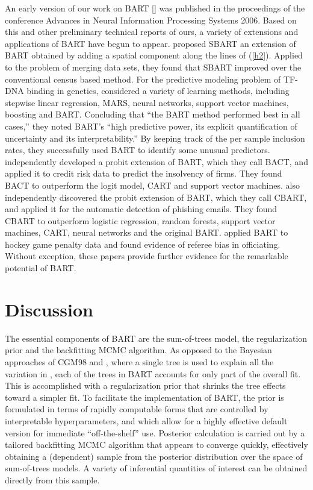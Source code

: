 \documentclass[aoas,nameyear,dvips]{arximspdf}
\newcommand{\citeasnoun}[1]{\citet{#1}}
\begin{document}
An early version of our work on BART [\citet{ChipGeorMcCu2007}] was
published in the proceedings of the conference Advances in Neural
Information Processing Systems 2006.  Based on this and other
preliminary technical reports of ours, a variety of extensions and
applications of BART have begun to appear.  \citeasnoun{ZhaShiMul2007}
proposed SBART an extension of BART obtained by adding a spatial
component along the lines of (\ref{h2}).  Applied to the problem of
merging data sets, they found that SBART improved over the conventional
census based method.  For the predictive modeling problem of TF-DNA
binding in genetics, \citeasnoun{ZhoLiu2008} considered a variety of learning methods,
including stepwise linear regression, MARS, neural networks, support
vector machines, boosting and BART.  Concluding that ``the BART method
performed best in all cases,'' they noted BART's ``high predictive
power, its explicit quantification of uncertainty and its
interpretability.''  By keeping track of the per sample inclusion
rates, they successfully used BART to identify some unusual predictors.
\citeasnoun{ZhaHae2007} independently developed a probit extension
of BART, which they call BACT,  and applied it to credit risk data to
predict the insolvency of firms.  They found BACT to outperform the
logit model, CART and support vector machines.
\citeasnoun{AbuNapWan2008} also independently discovered the probit
extension of BART, which they call CBART, and applied it for the
automatic detection of phishing emails.  They found CBART to outperform
logistic regression, random forests, support vector machines, CART,
neural networks and the original BART. \citeasnoun{AbreMcCu2006}
applied BART to hockey game penalty data and found evidence of referee
bias in officiating. Without exception, these papers provide further
evidence for the remarkable potential of BART.

\section{Discussion}\label{sec:disc}

The essential components of BART are the sum-of-trees model, the
regularization prior  and the backfitting MCMC algorithm. As opposed to the
Bayesian approaches of CGM98 and \citeasnoun{DeniMallSmit1998},
where a single tree is used to explain all the variation in ,
each of the trees in BART accounts for only part of the overall fit.  This is accomplished with
a regularization prior that shrinks the tree effects toward a simpler fit.
To facilitate the implementation of BART, the prior is formulated in terms of
rapidly computable forms that are controlled by interpretable hyperparameters,
and which allow for a highly effective default version for
immediate ``off-the-shelf'' use.  Posterior calculation is carried out by a
tailored backfitting MCMC algorithm that appears to converge quickly, effectively
obtaining a (dependent) sample from the posterior distribution over the space of sum-of-trees models.
A variety of inferential quantities of interest can be obtained directly from this sample.
\end{document}
